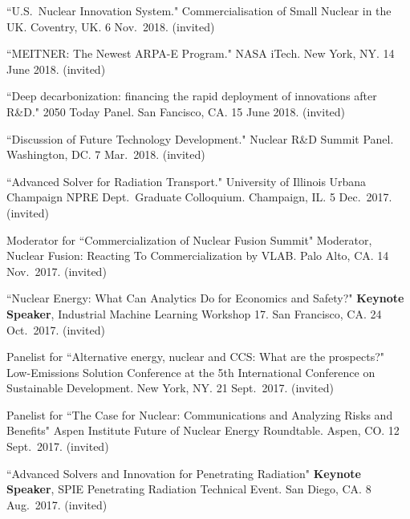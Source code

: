 \begin{bibsection}
\item ``U.S.\ Nuclear Innovation System." Commercialisation of Small Nuclear in the UK. Coventry, UK. 6 Nov.\ 2018. (invited)

\item ``MEITNER: The Newest ARPA-E Program." NASA iTech. New York, NY. 14 June 2018. (invited)

\item ``Deep decarbonization: financing the rapid deployment of innovations after R\&D." 2050 Today Panel. San Fancisco, CA. 15 June 2018. (invited)

\item ``Discussion of Future Technology Development." Nuclear R\&D Summit Panel. Washington, DC. 7 Mar.\ 2018. (invited)



\item ``Advanced Solver for Radiation Transport." University of Illinois Urbana Champaign NPRE Dept.\ Graduate Colloquium. Champaign, IL. 5 Dec.\ 2017. (invited)

\item Moderator for ``Commercialization of  Nuclear Fusion Summit" Moderator, Nuclear Fusion: Reacting To Commercialization by VLAB. Palo Alto, CA. 14 Nov.\ 2017. (invited)

\item ``Nuclear Energy: What Can Analytics Do for Economics and Safety?" \textbf{Keynote Speaker}, Industrial Machine Learning Workshop 17. San Francisco, CA. 24 Oct.\ 2017. (invited)

\item Panelist for ``Alternative energy, nuclear and CCS: What are the prospects?" Low-Emissions Solution Conference at the 5th International Conference on Sustainable Development. New York, NY. 21  Sept.\ 2017. (invited)

\item Panelist for ``The Case for Nuclear: Communications and Analyzing Risks and Benefits" Aspen Institute Future of Nuclear Energy Roundtable. Aspen, CO. 12  Sept.\ 2017. (invited)

\item ``Advanced Solvers and Innovation for Penetrating Radiation" \textbf{Keynote Speaker}, SPIE Penetrating Radiation Technical Event. San Diego, CA. 8 Aug.\ 2017. (invited)


\end{bibsection}
